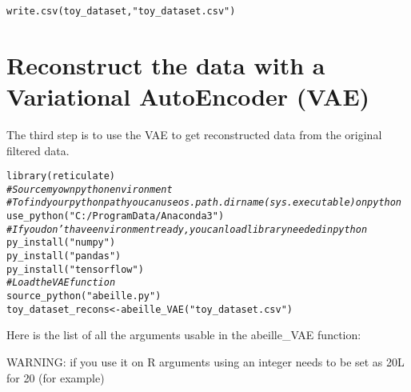 \documentclass[9pt]{article}\usepackage[]{graphicx}\usepackage[usenames,dvipsnames]{color}
\newcommand{\hlstr}[1]{\textcolor[rgb]{0.251,0.627,0.251}{#1}}%
\newcommand{\hlcom}[1]{\textcolor[rgb]{0.502,0.502,0.502}{\textit{#1}}}%
\newcommand{\hlstd}[1]{\textcolor[rgb]{0.251,0.251,0.251}{#1}}%
\newcommand{\hlkwb}[1]{\textcolor[rgb]{0,0,0}{#1}}%
\newcommand{\hlkwd}[1]{\textcolor[rgb]{0.878,0.439,0.125}{#1}}%
\newenvironment{knitrout}{}{} %
\begin{document}
\begin{knitrout}
\color{fgcolor}\begin{kframe}
\begin{alltt}
\hlkwd{write.csv}\hlstd{(toy_dataset,} \hlstr{"toy_dataset.csv"}\hlstd{)}
\end{alltt}
\end{kframe}
\end{knitrout}

\section{Reconstruct the data with a Variational AutoEncoder (VAE)}

The third step is to use the VAE to get reconstructed data from the original filtered data.

\begin{knitrout}
\color{fgcolor}\begin{kframe}
\begin{alltt}
\hlkwd{library}\hlstd{(reticulate)}
\hlcom{#Source my own python environment}
\hlcom{#To find your python path you can use os.path.dirname(sys.executable) on python}
\hlkwd{use_python}\hlstd{(}\hlstr{"C:/ProgramData/Anaconda3"}\hlstd{)}
\hlcom{#If you don't have environment ready, you can load library needed in python}
\hlkwd{py_install}\hlstd{(}\hlstr{"numpy"}\hlstd{)}
\hlkwd{py_install}\hlstd{(}\hlstr{"pandas"}\hlstd{)}
\hlkwd{py_install}\hlstd{(}\hlstr{"tensorflow"}\hlstd{)}
\hlcom{#Load the VAE function}
\hlkwd{source_python}\hlstd{(}\hlstr{"abeille.py"}\hlstd{)}
\hlstd{toy_dataset_recons} \hlkwb{<-} \hlkwd{abeille_VAE}\hlstd{(}\hlstr{"toy_dataset.csv"}\hlstd{)}
\end{alltt}
\end{kframe}
\end{knitrout}

Here is the list of all the arguments usable in the abeille\_VAE function:

WARNING: if you use it on R arguments using an integer needs to be set as 20L for 20 (for example)
\end{document}
